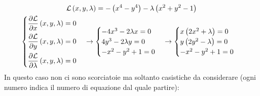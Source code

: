 \documentclass[a4paper]{article}
\begin{document}
	\begin{gather*}
		\mathcal{L}\left(x,y,\lambda\right) = -\left(x^{4}-y^{4}\right) - \lambda\left(x^{2}+y^{2}-1\right) \\
		\begin{cases}
			\dfrac{\partial \mathcal{L}}{\partial x}\left(x,y,\lambda\right) = 0 \vspace{.5em}\\
			\dfrac{\partial \mathcal{L}}{\partial y}\left(x,y,\lambda\right) = 0 \vspace{.5em}\\
			\dfrac{\partial \mathcal{L}}{\partial \lambda}\left(x,y,\lambda\right) = 0
		\end{cases}
		\rightarrow
		\begin{cases}
			-4x^{3}-2\lambda x = 0 \\
			4y^{3}-2\lambda y = 0 \\
			-x^{2}-y^{2}+1 = 0
		\end{cases}
		\rightarrow
		\begin{cases}
			x\left(2x^{2}+\lambda\right) = 0 \\
			y\left(2y^{2}-\lambda\right) = 0 \\
			-x^{2}-y^{2}+1 = 0
		\end{cases}
	\end{gather*}
	In questo caso non ci sono scorciatoie ma soltanto casistiche da considerare (ogni numero indica il numero di equazione dal quale partire):
\end{document}

